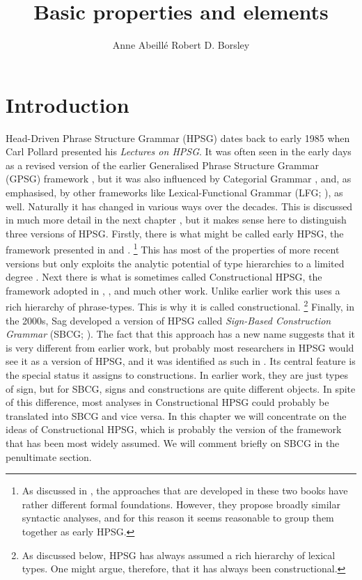 \documentclass[output=paper
	        ,collection
	        ,collectionchapter
 	        ,biblatex
                ,babelshorthands
                ,newtxmath
                ,draftmode
                ,colorlinks, citecolor=brown
]{langscibook}
\title{Basic properties and elements}
\author{%
 Anne Abeillé\affiliation{Université de Paris}%
 \lastand Robert D. Borsley\affiliation{University of Essex and Bangor University}%
}
\begin{document}
\maketitle
\label{chapter-basic-properties}\label{chap-properties}

\section{Introduction}\label{sec:prop1}
\label{prop:sec-intro}

Head-Driven Phrase Structure Grammar (HPSG) dates back to early 1985 when Carl Pollard presented his
\emph{Lectures on HPSG}. It was often seen in the early days as a revised version of the earlier
Generalised Phrase Structure Grammar (GPSG) framework \citep*{GKPS85a}, but it was also influenced
by Categorial Grammar \citep{Ajdukiewicz35a-u,Steedman2000a-u}, and, as \citet[1]{ps} emphasised, by
other frameworks like Lexical-Functional Grammar (LFG; \citealt{Bresnan82a-ed}), as well. Naturally
it has changed in various ways over the decades. This is discussed in much more detail in the next
chapter \citep*{chapters/evolution}, but it makes sense here to distinguish three versions of
HPSG. Firstly, there is what might be called early HPSG, the framework presented in \citet{ps} and
\citet{ps2}.%
%
\footnote{As discussed in , the approaches that are developed in
  these two books have rather different formal foundations. However, they propose broadly similar
  syntactic analyses, and for this reason it seems reasonable to group them together as early HPSG.} 
%
This has most of the properties of more recent versions but only exploits the analytic potential of
type hierarchies to a limited degree \citep*{Flickinger87,FPW85a}. Next there is what is sometimes
called Constructional HPSG, the framework adopted in , , and much
other work. Unlike earlier work this uses a rich hierarchy of phrase-types. This is why it is called
constructional.%
%
\footnote{As discussed below, HPSG has always assumed a rich hierarchy of lexical types. One might
  argue, therefore, that it has always been constructional.} 
%
Finally, in the 2000s, Sag developed a version of HPSG called \emph{Sign-Based Construction Grammar}
(SBCG; \citealt{Sag2012a}). The fact that this approach has a new name suggests that it is very
different from earlier work, but probably most researchers in HPSG would see it as a version of
HPSG, and it was identified as such in \citet[486]{Sag2010b}. Its central feature is the special
status it assigns to constructions. In earlier work, they are just types of sign, but for SBCG,
signs and constructions are quite different objects. In spite of this difference, most analyses in
Constructional HPSG could probably be translated into SBCG and vice versa. In this chapter we will
concentrate on the ideas of Constructional HPSG, which is probably the version of the framework that
has been most widely assumed. We will comment briefly on SBCG in the penultimate section. 
\end{document}
